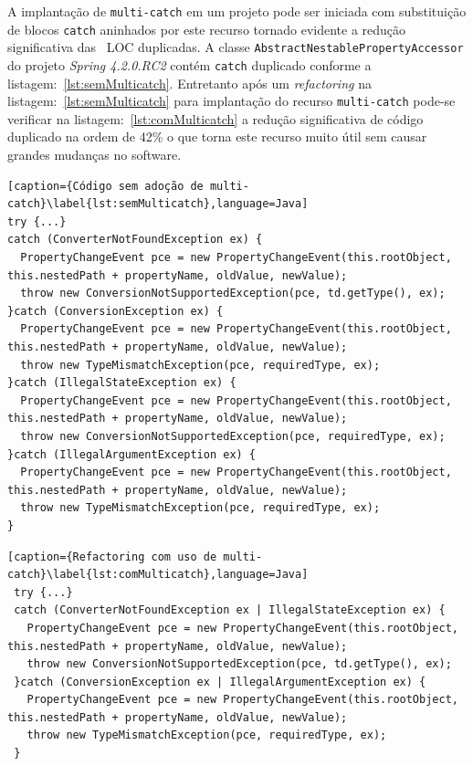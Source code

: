 A implantação de \texttt{multi-catch} em um projeto pode ser iniciada com substituição de blocos \texttt{catch} aninhados por este recurso tornado evidente a redução significativa das ~\acs{LOC} duplicadas. A classe \texttt{AbstractNestablePropertyAccessor} do projeto  \textit{Spring 4.2.0.RC2} contém \texttt{catch} duplicado conforme a listagem:~\ref{lst:semMulticatch}. Entretanto após um \textit{refactoring} na listagem:~\ref{lst:semMulticatch} para implantação do recurso \texttt{multi-catch} pode-se verificar na listagem:~\ref{lst:comMulticatch} a redução significativa de código duplicado na ordem de \num{42}\% o que torna este recurso muito útil sem causar grandes mudanças no software.


\begin{lstlisting}[caption={Código sem adoção de multi-catch}\label{lst:semMulticatch},language=Java] 
try {...}
catch (ConverterNotFoundException ex) {
  PropertyChangeEvent pce = new PropertyChangeEvent(this.rootObject, this.nestedPath + propertyName, oldValue, newValue);
  throw new ConversionNotSupportedException(pce, td.getType(), ex);
}catch (ConversionException ex) {
  PropertyChangeEvent pce = new PropertyChangeEvent(this.rootObject, this.nestedPath + propertyName, oldValue, newValue);
  throw new TypeMismatchException(pce, requiredType, ex);
}catch (IllegalStateException ex) {
  PropertyChangeEvent pce = new PropertyChangeEvent(this.rootObject, this.nestedPath + propertyName, oldValue, newValue);
  throw new ConversionNotSupportedException(pce, requiredType, ex);
}catch (IllegalArgumentException ex) {
  PropertyChangeEvent pce = new PropertyChangeEvent(this.rootObject, this.nestedPath + propertyName, oldValue, newValue);
  throw new TypeMismatchException(pce, requiredType, ex);
}
\end{lstlisting}


\begin{lstlisting}[caption={Refactoring com uso de multi-catch}\label{lst:comMulticatch},language=Java] 
 try {...}
 catch (ConverterNotFoundException ex | IllegalStateException ex) {
   PropertyChangeEvent pce = new PropertyChangeEvent(this.rootObject, this.nestedPath + propertyName, oldValue, newValue);
   throw new ConversionNotSupportedException(pce, td.getType(), ex);
 }catch (ConversionException ex | IllegalArgumentException ex) {
   PropertyChangeEvent pce = new PropertyChangeEvent(this.rootObject, this.nestedPath + propertyName, oldValue, newValue);
   throw new TypeMismatchException(pce, requiredType, ex);
 }	
\end{lstlisting}

